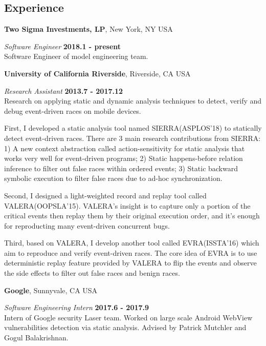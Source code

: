 \documentclass[margin,line]{res}
\begin{document}
\begin{resume}
\section{\sc Experience}
{\bf Two Sigma Investments, LP}, New York, NY USA

\vspace{-.3cm}
{\em Software Engineer} \hfill {\bf 2018.1 - present} \\
Software Engineer of model engineering team.

{\bf University of California Riverside}, Riverside, CA USA

\vspace{-.3cm}
{\em Research Assistant} \hfill {\bf 2013.7 - 2017.12}\\
Research on applying static and dynamic analysis techniques to detect, verify and debug
event-driven races on mobile devices.

\vspace{-.3cm}
First, I developed a static analysis tool named SIERRA(ASPLOS'18) to statically detect event-driven races.
There are 3 main research contributions from SIERRA: 1) A new context abstraction called action-sensitivity for
static analysis that works very well for event-driven programs; 2) Static happens-before relation inference
to filter out false races within ordered events; 3) Static backward symbolic execution to filter false races
due to ad-hoc synchronization.

\vspace{-.3cm}
Second, I designed a light-weighted record and replay tool called VALERA(OOPSLA'15).
VALERA's insight is to capture only a portion of the critical
events then replay them by their original execution order, 
and it's enough for reproducting many event-driven concurrent bugs.

\vspace{-.3cm}
Third, based on VALERA, I develop another tool called EVRA(ISSTA'16) which aim
to reproduce and verify event-driven races. The core idea of EVRA is to 
use deterministic replay feature provided by VALERA to flip the
events and observe the side effects to filter out false races and benign races.


{\bf Google}, Sunnyvale, CA USA

\vspace{-.3cm}
{\em Software Engineering Intern} \hfill {\bf 2017.6 - 2017.9}\\
Intern of Google security Laser team. Worked on large scale Android WebView vulnerabilities
detection via static analysis. Advised by Patrick Mutchler and Gogul Balakrishnan.


\end{resume}
\end{document}
